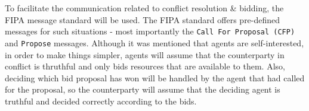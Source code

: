 \documentclass[main.tex]{subfiles}
\begin{document}
To facilitate the communication related to conflict resolution \& bidding, the FIPA message
standard will be used.  The FIPA standard offers pre-defined messages for such situations -
most importantly the \texttt{Call For Proposal (CFP)} and \texttt{Propose} messages. Although
it was mentioned that agents are self-interested, in order to make things simpler, agents will
assume that the counterparty in conflict is thruthful and only bids resources that are
available to them. Also, deciding which bid proposal has won will be handled by the agent that
had called for the proposal, so the counterparty will assume that the deciding agent is
truthful and decided correctly according to the bids. 






\end{document}
